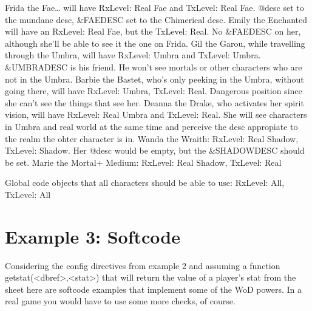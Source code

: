 \documentclass[letterpaper,10pt,english]{sphinxmanual}
\begin{document}
\sphinxAtStartPar
Frida the Fae… will have RxLevel: Real Fae and TxLevel: Real Fae. @desc
set to the mundane desc, \&FAEDESC set to the Chimerical desc.
Emily the Enchanted will have an RxLevel: Real Fae, but the TxLevel: Real.
No \&FAEDESC on her, although she’ll be able to see it the one on Frida.
Gil the Garou, while travelling through the Umbra, will have RxLevel: Umbra
and TxLevel: Umbra. \&UMBRADESC is his friend. He won’t see mortals or other
characters who are not in the Umbra.
Barbie the Bastet, who’s only peeking in the Umbra, without going there,
will have RxLevel: Umbra, TxLevel: Real. Dangerous position since she
can’t see the things that see her.
Deanna the Drake, who activates her spirit vision, will have
RxLevel: Real Umbra and TxLevel: Real. She will see characters in Umbra and
real world at the same time and perceive the desc appropiate to the realm
the ohter character is in.
Wanda the Wraith: RxLevel: Real Shadow, TxLevel: Shadow. Her @desc
would be empty, but the \&SHADOWDESC should be set.
Marie the Mortal+ Medium: RxLevel: Real Shadow, TxLevel: Real

\sphinxAtStartPar
Global code objects that all characters should be able to use:
RxLevel: All, TxLevel: All


\section{Example 3: Softcode}
\label{\detokenize{19-reality:example-3-softcode}}
\sphinxAtStartPar
Considering the config directives from example 2 and assuming a function
getstat(\textless{}dbref\textgreater{},\textless{}stat\textgreater{}) that will return the value of a player’s stat from
the sheet here are softcode examples that implement some of the WoD powers.
In a real game you would have to use some more checks, of course.
\end{document}
